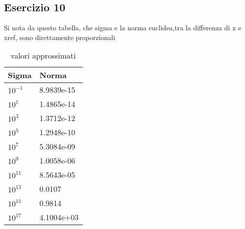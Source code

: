\subsection{Esercizio 10}
Si nota da questo tabella, che sigma e la norma euclidea,tra la differenza di x e xref, sono  direttamente  proporzionali
\begin{table}[h]
\begin{tabular}{|l l|}
        \hline
        Sigma  &  Norma\\
        \hline
         $10^{-1}$  &  8.9839e-15\\
         $10^{1}$ &  1.4865e-14 \\
         $10^{3}$ &  1.3712e-12 \\
         $10^{5}$ &  1.2948e-10 \\
         $10^{7}$ &  5.3084e-09 \\
         $10^{9}$ &  1.0058e-06 \\
         $10^{11}$ &  8.5643e-05 \\
         $10^{13}$ &  0.0107 \\
         $10^{15}$ &  0.9814 \\
         $10^{17}$ & 4.1004e+03\\
        \hline
\end{tabular}
\caption{valori approssimati}
\label{tab::1}     
\end{table}
